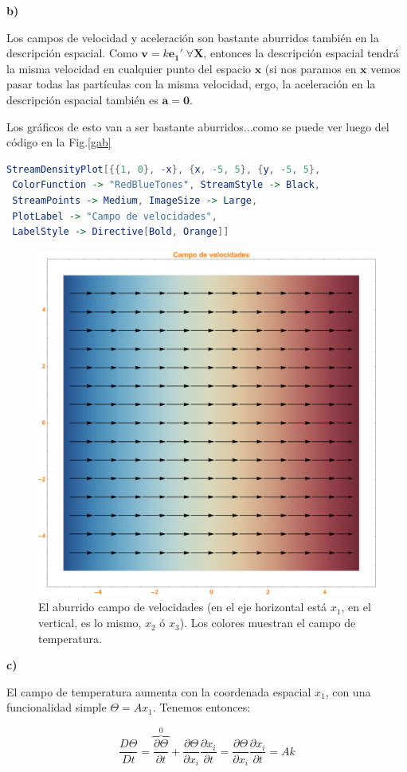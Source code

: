 \documentclass[10pt,a4paper]{article}
\begin{document}
\textbf{b)}

Los campos de velocidad y aceleración son bastante aburridos también en la descripción espacial. Como $\mathbf{v} = k \mathbf{e_1}'\; \forall \mathbf{X}$, entonces la descripción espacial tendrá la misma velocidad en cualquier punto del espacio $\mathbf{x}$ (si nos paramos en $\mathbf{x}$ vemos pasar todas las partículas con la misma velocidad, ergo, la aceleración en la descripción espacial también es $\mathbf{a} = \mathbf{0}$.

Los gráficos de esto van a ser bastante aburridos...como se puede ver luego del código en la Fig.\eqref{gab}

\begin{lstlisting}[language = Mathematica]
StreamDensityPlot[{{1, 0}, -x}, {x, -5, 5}, {y, -5, 5}, 
 ColorFunction -> "RedBlueTones", StreamStyle -> Black, 
 StreamPoints -> Medium, ImageSize -> Large,
 PlotLabel -> "Campo de velocidades", 
 LabelStyle -> Directive[Bold, Orange]]

\end{lstlisting}

\begin{figure}[h!]
\centering
\includegraphics[width=0.5\linewidth]{vejercicio1.pdf}
  \caption{El aburrido campo de velocidades (en el eje horizontal está $x_1$, en el vertical, es lo mismo, $x_2$ ó $x_3$). Los colores muestran el campo de temperatura.}
  \label{gab}
\end{figure}



\textbf{c)}

El campo de temperatura aumenta con la coordenada espacial $x_1$, con una funcionalidad simple $\Theta  = Ax_1$. Tenemos entonces:

\begin{equation}
\frac{D \Theta}{D t} = \overbrace{\frac{\partial \Theta}{\partial t}}^0 + \frac{\partial \Theta}{\partial x_i} \frac{\partial x_i}{\partial t} = \frac{\partial \Theta}{\partial x_i} \frac{\partial x_i}{\partial t} = A k 
\end{equation}
\end{document}
